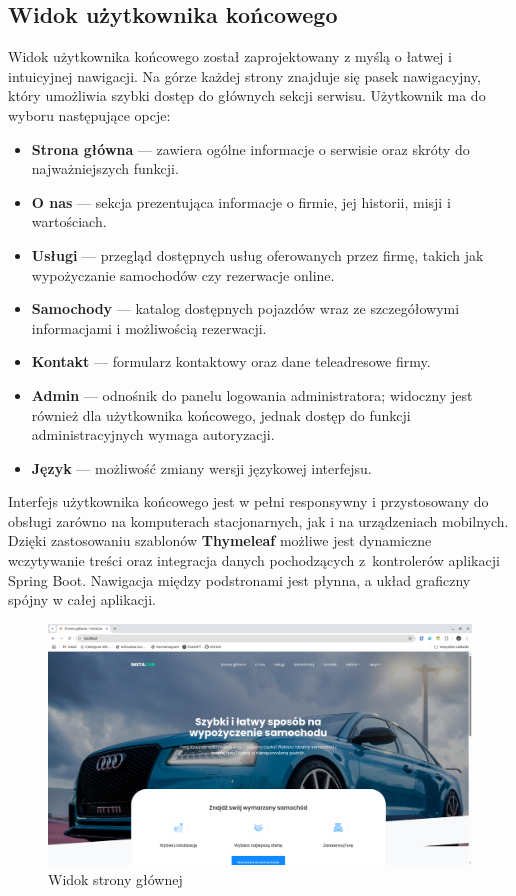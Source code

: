 \documentclass[12pt]{article}
\begin{document}
	
	\subsection{Widok użytkownika końcowego}
	
	Widok użytkownika końcowego został zaprojektowany z myślą o łatwej i intuicyjnej nawigacji. Na górze każdej strony znajduje się pasek nawigacyjny, który umożliwia szybki dostęp do głównych sekcji serwisu. Użytkownik ma do wyboru następujące opcje:
	
	\begin{itemize}
		\item \textbf{Strona główna} --- zawiera ogólne informacje o serwisie oraz skróty do najważniejszych funkcji.
		\item \textbf{O nas} --- sekcja prezentująca informacje o firmie, jej historii, misji i wartościach.
		\item \textbf{Usługi} --- przegląd dostępnych usług oferowanych przez firmę, takich jak wypożyczanie samochodów czy rezerwacje online.
		\item \textbf{Samochody} --- katalog dostępnych pojazdów wraz ze szczegółowymi informacjami i możliwością rezerwacji.
		\item \textbf{Kontakt} --- formularz kontaktowy oraz dane teleadresowe firmy.
		\item \textbf{Admin} --- odnośnik do panelu logowania administratora; widoczny jest również dla użytkownika końcowego, jednak dostęp do funkcji administracyjnych wymaga autoryzacji.
		\item \textbf{Język} --- możliwość zmiany wersji językowej interfejsu.
	\end{itemize}
	Interfejs użytkownika końcowego jest w pełni responsywny i przystosowany do obsługi zarówno na komputerach stacjonarnych, jak i na urządzeniach mobilnych. Dzięki zastosowaniu szablonów \textbf{Thymeleaf} możliwe jest dynamiczne wczytywanie treści oraz integracja danych pochodzących z~kontrolerów aplikacji Spring Boot. Nawigacja między podstronami jest płynna, a układ graficzny spójny w całej aplikacji.
	
	\begin{figure}[H]
		\centering
		\includegraphics[width=1\linewidth]{homepage}
		\caption{Widok strony głównej}
		\label{fig:homepage}
	\end{figure}
	
\end{document}

